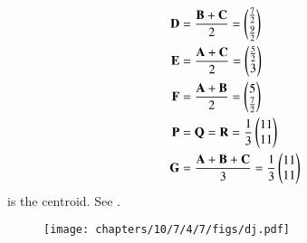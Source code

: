 \begin{align}
\mathbf{D}&=\frac{\mathbf{B}+\mathbf{C}}{2}
=\begin{pmatrix}\frac{7}{2}\\[2pt] \frac{9}{2}\end{pmatrix}\\
\mathbf{E}&=\frac{\mathbf{A}+\mathbf{C}}{2}
=\begin{pmatrix}\frac{5}{2}\\ 3\end{pmatrix}\\
\mathbf{F}&=\frac{\mathbf{A}+\mathbf{B}}{2}
=\begin{pmatrix}5\\ \frac{7}{2}\end{pmatrix}
\\
\mathbf{P}
	&=\mathbf{Q}
=\mathbf{R}
=\frac{1}{3}\begin{pmatrix}11\\11\end{pmatrix}
\\
\mathbf{G}&=\frac{\mathbf{A}+\mathbf{B}+\mathbf{C}}{3}
=\frac{1}{3}\begin{pmatrix}11\\11\end{pmatrix}
\end{align} 
is the centroid.
See 
  .
\begin{figure}[H]
\centering
\texttt{[image: chapters/10/7/4/7/figs/dj.pdf]}
\caption{}
  \label{fig:chapters/10/7/4/7/Figure}
\end{figure}
